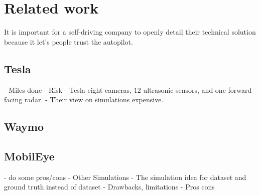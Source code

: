 \chapter{Related work}
\label{chap:relatedwork}

It is important for a self-driving company to openly detail their technical
solution because it let's people trust the autopilot.

\section{Tesla}
- Miles done
- Risk
- Tesla  eight cameras, 12 ultrasonic sensors, and one forward-facing radar.
  - Their view on simulations
expensive.
\section{Waymo}
\section{MobilEye}

  -  do some pros/cons
- Other Simulations
- The simulation idea for dataset and ground truth instead of dataset
  - Drawbacks, limitations
  - Pros cons
